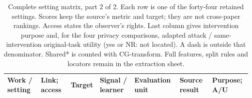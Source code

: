 \begin{table}[t]\centering\footnotesize
\caption{Complete setting matrix, part 2 of 2. Each row is one of the forty-four retained settings. Scores keep the source's metric and target; they are not cross-paper rankings. Access states the observer's rights. Last column gives intervention purpose and, for the four privacy comparisons, adapted attack / same-intervention original-task utility (yes or NR: not located). A dash is outside that denominator. Shared* is counted with CG-transform. Full features, split rules and locators remain in the extraction sheet.}\label{tab:complete-matrix-b}
\setlength{\tabcolsep}{3pt}\renewcommand{\arraystretch}{1.12}
\begin{tabularx}{\textwidth}{@{}P{.14\textwidth}P{.11\textwidth}P{.13\textwidth}P{.14\textwidth}P{.12\textwidth}Y P{.09\textwidth}@{}}\toprule
Work / setting & Link; access & Target & Signal / learner & Evaluation unit & Source result & Purpose; A/U \\\midrule


\end{tabularx}
\end{table}
